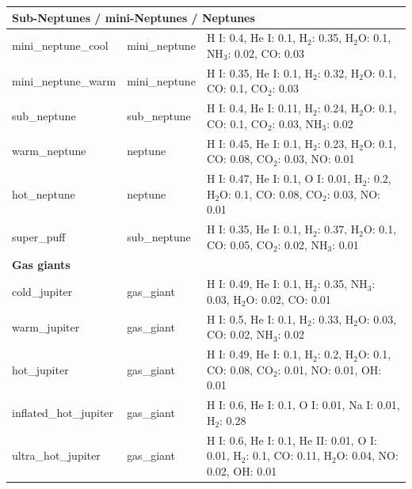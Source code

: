 \begin{longtable}{lll}
\multicolumn{3}{l}{\textbf{Sub-Neptunes / mini-Neptunes / Neptunes}} \\
\midrule
mini\_neptune\_cool & mini\_neptune & H I: 0.4, He I: 0.1, H$_{2}$: 0.35, H$_{2}$O: 0.1, NH$_{3}$: 0.02, CO: 0.03 \\
mini\_neptune\_warm & mini\_neptune & H I: 0.35, He I: 0.1, H$_{2}$: 0.32, H$_{2}$O: 0.1, CO: 0.1, CO$_{2}$: 0.03 \\
sub\_neptune & sub\_neptune & H I: 0.4, He I: 0.11, H$_{2}$: 0.24, H$_{2}$O: 0.1, CO: 0.1, CO$_{2}$: 0.03, NH$_{3}$: 0.02 \\
warm\_neptune & neptune & H I: 0.45, He I: 0.1, H$_{2}$: 0.23, H$_{2}$O: 0.1, CO: 0.08, CO$_{2}$: 0.03, NO: 0.01 \\
hot\_neptune & neptune & H I: 0.47, He I: 0.1, O I: 0.01, H$_{2}$: 0.2, H$_{2}$O: 0.1, CO: 0.08, CO$_{2}$: 0.03, NO: 0.01 \\
super\_puff & sub\_neptune & H I: 0.35, He I: 0.1, H$_{2}$: 0.37, H$_{2}$O: 0.1, CO: 0.05, CO$_{2}$: 0.02, NH$_{3}$: 0.01 \\
\midrule

\multicolumn{3}{l}{\textbf{Gas giants}} \\
\midrule
cold\_jupiter & gas\_giant & H I: 0.49, He I: 0.1, H$_{2}$: 0.35, NH$_{3}$: 0.03, H$_{2}$O: 0.02, CO: 0.01 \\
warm\_jupiter & gas\_giant & H I: 0.5, He I: 0.1, H$_{2}$: 0.33, H$_{2}$O: 0.03, CO: 0.02, NH$_{3}$: 0.02 \\
hot\_jupiter & gas\_giant & H I: 0.49, He I: 0.1, H$_{2}$: 0.2, H$_{2}$O: 0.1, CO: 0.08, CO$_{2}$: 0.01, NO: 0.01, OH: 0.01 \\
inflated\_hot\_jupiter & gas\_giant & H I: 0.6, He I: 0.1, O I: 0.01, Na I: 0.01, H$_{2}$: 0.28 \\
ultra\_hot\_jupiter & gas\_giant & H I: 0.6, He I: 0.1, He II: 0.01, O I: 0.01, H$_{2}$: 0.1, CO: 0.11, H$_{2}$O: 0.04, NO: 0.02, OH: 0.01 \\
\midrule

\end{longtable}
